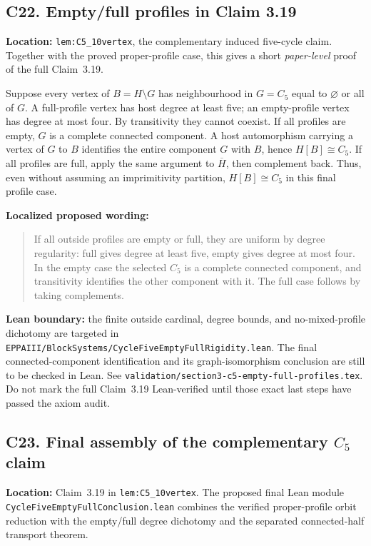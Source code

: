 \documentclass[11pt,a4paper]{article}
\begin{document}
\subsection*{C22. Empty/full profiles in Claim 3.19}
\textbf{Location:} \texttt{lem:C5\_10vertex}, the complementary
induced five-cycle claim. Together with the proved
proper-profile case, this gives a short \emph{paper-level}
proof of the full Claim~3.19.

Suppose every vertex of \(B=H\setminus G\) has
neighbourhood in \(G=C_5\) equal to \(\varnothing\)
or all of \(G\). A full-profile vertex has host degree
at least five; an empty-profile vertex has degree
at most four. By transitivity they cannot coexist.
If all profiles are empty, \(G\) is a complete connected
component. A host automorphism carrying a vertex
of \(G\) to \(B\) identifies the entire component
\(G\) with \(B\), hence \(H[B]\cong C_5\).
If all profiles are full, apply the same argument to
\(\overline H\), then complement back.
Thus, even without assuming an imprimitivity partition,
\(H[B]\cong C_5\) in this final profile case.

\textbf{Localized proposed wording:}
\begin{quote}
If all outside profiles are empty or full, they
are uniform by degree regularity: full gives degree
at least five, empty gives degree at most four.
In the empty case the selected \(C_5\) is a complete
connected component, and transitivity identifies
the other component with it. The full case follows
by taking complements.
\end{quote}

\textbf{Lean boundary:} the finite outside cardinal,
degree bounds, and no-mixed-profile dichotomy
are targeted in
\texttt{EPPAIII/BlockSystems/CycleFiveEmptyFullRigidity.lean}.
The final connected-component identification
and its graph-isomorphism conclusion are still to be
checked in Lean. See
\texttt{validation/section3-c5-empty-full-profiles.tex}.
Do not mark the full Claim~3.19 Lean-verified until
those exact last steps have passed the axiom audit.

\subsection*{C23. Final assembly of the complementary \(C_5\) claim}
\textbf{Location:} Claim~3.19 in \texttt{lem:C5\_10vertex}.
The proposed final Lean module
\texttt{CycleFiveEmptyFullConclusion.lean} combines
the verified proper-profile orbit reduction with
the empty/full degree dichotomy and the separated
connected-half transport theorem.
\end{document}

